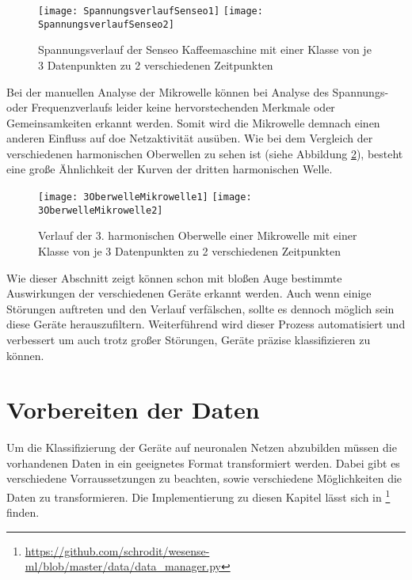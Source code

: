     \begin{figure}[H]
        \centering
        \texttt{[image: SpannungsverlaufSenseo1]}
        \texttt{[image: SpannungsverlaufSenseo2]}
        \caption{Spannungsverlauf der Senseo Kaffeemaschine mit einer Klasse von je 3 Datenpunkten zu 2 verschiedenen Zeitpunkten}
        \label{fig:SpannungsverlaufSenseo}
    \end{figure}

    \noindent
    Bei der manuellen Analyse der Mikrowelle können bei Analyse des Spannungs- oder Frequenzverlaufs leider keine hervorstechenden Merkmale oder Gemeinsamkeiten erkannt werden.
    Somit wird die Mikrowelle demnach einen anderen Einfluss auf doe Netzaktivität ausüben.
    Wie bei dem Vergleich der verschiedenen harmonischen Oberwellen zu sehen ist (siehe Abbildung \ref{fig:3OberwelleMikrowelle}), besteht eine große Ähnlichkeit der Kurven der dritten harmonischen Welle.\\
    \newline

    \begin{figure}[H]
        \centering
        \texttt{[image: 3OberwelleMikrowelle1]}
        \texttt{[image: 3OberwelleMikrowelle2]}
        \caption{Verlauf der 3. harmonischen Oberwelle einer Mikrowelle mit einer Klasse von je 3 Datenpunkten zu 2 verschiedenen Zeitpunkten}
        \label{fig:3OberwelleMikrowelle}
    \end{figure}

    \noindent
    Wie dieser Abschnitt zeigt können schon mit bloßen Auge bestimmte Auswirkungen der verschiedenen Geräte erkannt werden.
    Auch wenn einige Störungen auftreten und den Verlauf verfälschen, sollte es dennoch möglich sein diese Geräte herauszufiltern.
    Weiterführend wird dieser Prozess automatisiert und verbessert um auch trotz großer Störungen, Geräte präzise klassifizieren zu können. 

\section{Vorbereiten der Daten}\label{VorbereitenDerDaten}
    Um die Klassifizierung der Geräte auf neuronalen Netzen abzubilden müssen die vorhandenen Daten in ein geeignetes Format transformiert werden.
    Dabei gibt es verschiedene Vorraussetzungen zu beachten, sowie verschiedene Möglichkeiten die Daten zu transformieren.
    Die Implementierung zu diesen Kapitel lässt sich in \footnote{\url{https://github.com/schrodit/wesense-ml/blob/master/data/data_manager.py}} finden.\\
    
